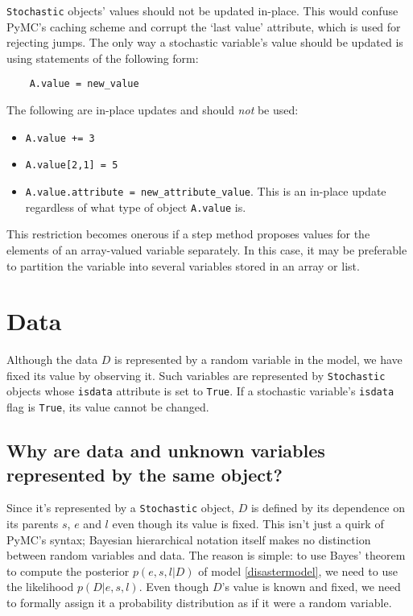 \texttt{Stochastic} objects' values should not be updated in-place. This would confuse PyMC's caching scheme and corrupt the `last value' attribute, which is used for rejecting jumps. The only way a stochastic variable's value should be updated is using statements of the following form:
\begin{verbatim}
    A.value = new_value
\end{verbatim}
The following are in-place updates and should \emph{not} be used:
\begin{itemize}
    \item \texttt{A.value += 3}
    \item \texttt{A.value[2,1] = 5}
    \item \texttt{A.value.attribute = new_attribute_value}. This is an in-place update regardless of what type of object \texttt{A.value} is.
\end{itemize}

This restriction becomes onerous if a step method proposes values for the elements of an array-valued variable separately. In this case, it may be preferable to partition the variable into several variables stored in an array or list.

\section{Data}

Although the data $D$ is represented by a random variable in the model, we have fixed its value by observing it. Such variables are represented by \texttt{Stochastic} objects whose \texttt{isdata} attribute is set to \texttt{True}. If a stochastic variable's \texttt{isdata} flag is \texttt{True}, its value cannot be changed.

\subsection{Why are data and unknown variables represented by the same object?}
Since it's represented by a \texttt{Stochastic} object, $D$ is defined by its dependence on its parents $s$, $e$ and $l$ even though its value is fixed. This isn't just a quirk of PyMC's syntax; Bayesian hierarchical notation itself makes no distinction between random variables and data. The reason is simple: to use Bayes' theorem to compute the posterior $p(e,s,l|D)$ of model \ref{disastermodel}, we need to use the likelihood $p(D|e,s,l)$. Even though $D$'s value is known and fixed, we need to formally assign it a probability distribution as if it were a random variable.


